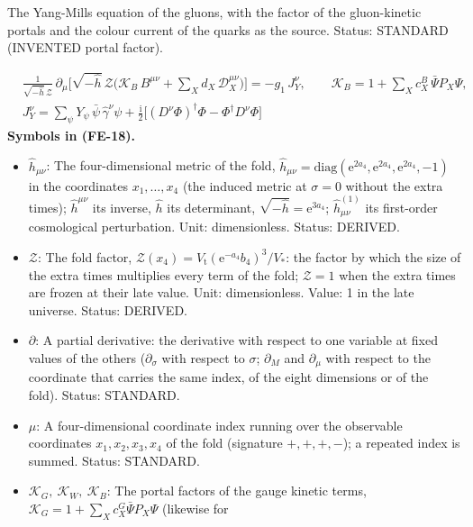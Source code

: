 \documentclass[
  10pt,
]{article}
\providecommand{\tightlist}{%
  \setlength{\itemsep}{0pt}\setlength{\parskip}{0pt}}
\begin{document}
The Yang-Mills equation of the gluons, with the factor of the
gluon-kinetic portals and the colour current of the quarks as the
source. Status: STANDARD (INVENTED portal factor).

\[
\begin{aligned}
&\frac{1}{\sqrt{-\hat h}\,\mathcal{Z}}\,\partial_\mu\Big[\sqrt{-\hat h}\,\mathcal{Z}\Big(\mathcal{K}_{B}\,B^{\mu\nu}
 + \sum_X d_X\,\mathcal{D}_X^{\mu\nu}\Big)\Big] = -g_1\,J_Y^\nu,\qquad \mathcal{K}_{B} = 1 + \sum_X c^{B}_X\,\bar\Psi P_X\Psi,\\
&J_Y^\nu = \sum_\psi Y_\psi\,\bar\psi\,\hat\gamma^\nu\psi + \frac{\mathrm{i}}{2}\big[(D^\nu\Phi)^\dagger\Phi - \Phi^\dagger D^\nu\Phi\big]
\end{aligned} \tag{FE-18}
\] \textbf{Symbols in (FE-18).}

\begin{itemize}
\tightlist
\item
  \(\hat h_{\mu\nu}\): The four-dimensional metric of the fold,
  \(\hat h_{\mu\nu} = \mathrm{diag}(\mathrm{e}^{2a_4}, \mathrm{e}^{2a_4}, \mathrm{e}^{2a_4}, -1)\)
  in the coordinates \(x_1, \dots, x_4\) (the induced metric at
  \(\sigma = 0\) without the extra times); \(\hat h^{\mu\nu}\) its
  inverse, \(\hat h\) its determinant,
  \(\sqrt{-\hat h} = \mathrm{e}^{3a_4}\); \(\hat h^{(1)}_{\mu\nu}\) its
  first-order cosmological perturbation. Unit: dimensionless. Status:
  DERIVED.
\item
  \(\mathcal{Z}\): The fold factor,
  \(\mathcal{Z}(x_4) = V_{\mathrm{t}}(\mathrm{e}^{-a_4}b_4)^3/V_*\): the
  factor by which the size of the extra times multiplies every term of
  the fold; \(\mathcal{Z} = 1\) when the extra times are frozen at their
  late value. Unit: dimensionless. Value: 1 in the late universe.
  Status: DERIVED.
\item
  \(\partial\): A partial derivative: the derivative with respect to one
  variable at fixed values of the others (\(\partial_\sigma\) with
  respect to \(\sigma\); \(\partial_M\) and \(\partial_\mu\) with
  respect to the coordinate that carries the same index, of the eight
  dimensions or of the fold). Status: STANDARD.
\item
  \(\mu\): A four-dimensional coordinate index running over the
  observable coordinates \(x_1, x_2, x_3, x_4\) of the fold (signature
  \(+,+,+,-\)); a repeated index is summed. Status: STANDARD.
\item
  \(\mathcal{K}_{G},\ \mathcal{K}_{W},\ \mathcal{K}_{B}\): The portal
  factors of the gauge kinetic terms,
  \(\mathcal{K}_{G} = 1 + \sum_Xc^{G}_X\bar\Psi P_X\Psi\) (likewise for

\end{itemize}
\end{document}
